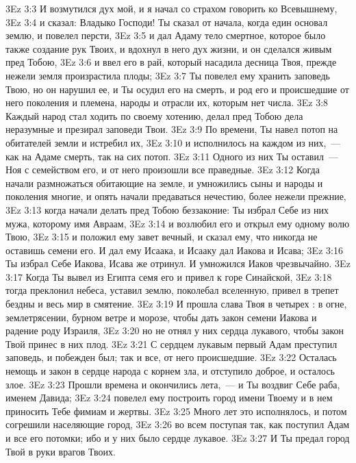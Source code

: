 \vs 3Ez 3:3 И возмутился дух мой, и я начал со страхом говорить ко Всевышнему,
\vs 3Ez 3:4 и сказал: Владыко Господи! Ты сказал от начала, когда един основал землю, и повелел персти,
\vs 3Ez 3:5 и дал Адаму тело смертное, которое было также создание рук Твоих, и вдохнул в него дух жизни, и он сделался живым пред Тобою,
\vs 3Ez 3:6 и ввел его в рай, который насадила десница Твоя, прежде нежели земля произрастила плоды;
\vs 3Ez 3:7 Ты повелел ему хранить заповедь Твою, но он нарушил ее, и Ты осудил его на смерть, и род его и происшедшие от него поколения и племена, народы и отрасли их, которым нет числа.
\vs 3Ez 3:8 Каждый народ стал ходить по своему хотению, делал пред Тобою дела неразумные и презирал заповеди Твои.
\vs 3Ez 3:9 По времени, Ты навел потоп на обитателей земли и истребил их,
\vs 3Ez 3:10 и исполнилось на каждом из них,~--- как на Адаме смерть, так на сих потоп.
\vs 3Ez 3:11 Одного из них Ты оставил~--- Ноя с семейством его, и от него произошли все праведные.
\vs 3Ez 3:12 Когда начали размножаться обитающие на земле, и умножились сыны и народы и поколения многие, и опять начали предаваться нечестию, более нежели прежние,
\vs 3Ez 3:13 когда начали делать пред Тобою беззаконие: Ты избрал Себе из них мужа, которому имя Авраам,
\vs 3Ez 3:14 и возлюбил его и открыл ему одному волю Твою,
\vs 3Ez 3:15 и положил ему завет вечный, и сказал ему, что никогда не оставишь семени его. И дал ему Исаака, и Исааку дал Иакова и Исава;
\vs 3Ez 3:16 Ты избрал Себе Иакова, Исава же отринул. И умножился Иаков чрезвычайно.
\vs 3Ez 3:17 Когда Ты вывел из Египта семя его и привел к горе Синайской,
\vs 3Ez 3:18 тогда преклонил небеса, уставил землю, поколебал вселенную, привел в трепет бездны и весь мир в смятение.
\vs 3Ez 3:19 И прошла слава Твоя в четырех : в огне, землетрясении, бурном ветре и морозе, чтобы дать закон семени Иакова и радение роду Израиля,
\vs 3Ez 3:20 но не отнял у них сердца лукавого, чтобы закон Твой принес в них плод.
\vs 3Ez 3:21 С сердцем лукавым первый Адам преступил заповедь, и побежден был; так и все, от него происшедшие.
\vs 3Ez 3:22 Осталась немощь и закон в сердце народа с корнем зла, и отступило доброе, и осталось злое.
\vs 3Ez 3:23 Прошли времена и окончились лета,~--- и Ты воздвиг Себе раба, именем Давида;
\vs 3Ez 3:24 повелел ему построить город имени Твоему и в нем приносить Тебе фимиам и жертвы.
\vs 3Ez 3:25 Много лет это исполнялось, и потом согрешили населяющие город,
\vs 3Ez 3:26 во всем поступая так, как поступил Адам и все его потомки; ибо и у них было сердце лукавое.
\vs 3Ez 3:27 И Ты предал город Твой в руки врагов Твоих.
